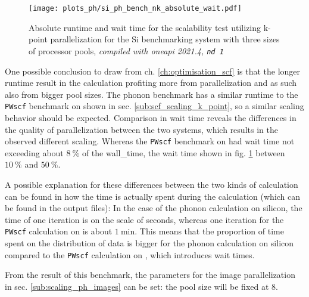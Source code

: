 \documentclass[main.tex]{subfiles}
\begin{document}
\begin{figure}[htb!]
    \centering
    \texttt{[image: plots\_ph/si\_ph\_bench\_nk\_absolute\_wait.pdf]}
    \caption{Absolute runtime and wait time for the scalability test utilizing k-point parallelization for the Si benchmarking system with three sizes of processor pools, \emph{\QE compiled with \gls{oneapi} 2021.4, \texttt{nd 1}}}
    \label{fig:scaling_ph_nk_si_absolute_wait}
\end{figure}
One possible conclusion to draw from ch. \ref{ch:optimisation_scf} is that the longer runtime result in the calculation profiting more from parallelization and as such also from bigger pool sizes.
The phonon benchmark has a similar runtime to the \texttt{PWscf} benchmark on \TaS shown in sec. \ref{sub:scf_scaling_k_point}, so a similar scaling behavior should be expected.
Comparison in wait time reveals the differences in the quality of parallelization between the two systems, which results in the observed different scaling. 
Whereas the \texttt{PWscf} benchmark on \TaS had wait time not exceeding about \(\SI{8}{\percent}\) of the \gls{wall_time}, the wait time shown in fig. \ref{fig:scaling_ph_nk_si_absolute_wait} between \(\SI{10}{\percent}\) and \(\SI{50}{\percent}\).

A possible explanation for these differences between the two kinds of calculation can be found in how the time is actually spent during the calculation (which can be found in the \QE output files):
In the case of the phonon calculation on silicon, the time of one iteration is on the scale of seconds, whereas one iteration for the \texttt{PWscf} calculation on \TaS is about \(\SI{1}{\minute}\).
This means that the proportion of time spent on the distribution of data is bigger for the phonon calculation on silicon compared to the \texttt{PWscf} calculation on \TaS, which introduces wait times.

From the result of this benchmark, the parameters for the image parallelization in sec. \ref{sub:scaling_ph_images} can be set: the pool size will be fixed at 8.
\end{document}
